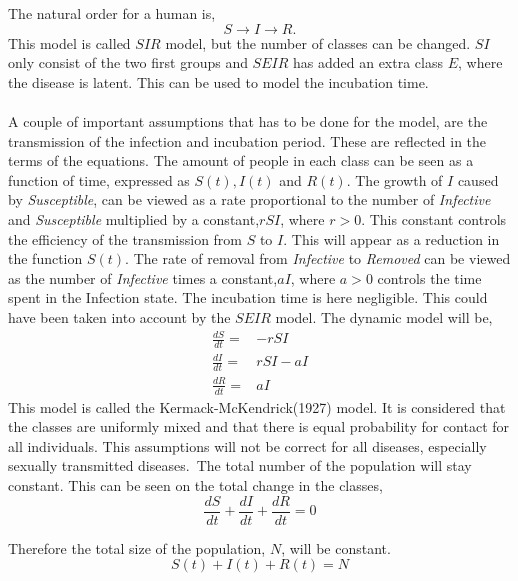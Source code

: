 \documentclass[%
twoside,                 %
final,                   %
10pt]{article}
\begin{document}
\noindent
The natural order for a human is,
\begin{equation}
S \rightarrow I \rightarrow R.
\end{equation}
This model is called $SIR$ model, but the number of classes can be changed. $SI$ only consist of the two first groups and $SEIR$ has added an extra class $E$, where the disease is latent. This can be used to model the incubation time. 
\\
\\
A couple of important assumptions that has to be done for the model, are the transmission of the infection and incubation period. These are reflected in the terms of the equations. The amount of people in each class can be seen as a function of time, expressed as $S(t),I(t)$ and $R(t)$. The growth of $I$ caused by \emph{Susceptible}, can be viewed as a rate proportional to the number of \emph{Infective} and \emph{Susceptible} multiplied by a constant,$rSI$, where $r>0$. This constant controls the efficiency of the transmission from $S$ to $I$. This will appear as a reduction in the function $S(t)$. The rate of removal from \emph{Infective} to \emph{Removed} can be viewed as the number of \emph{Infective} times a constant,$aI$, where $a>0$ controls the time spent in the Infection state. The incubation time is here negligible. This could have been taken into account by the $SEIR$ model. The dynamic model will be,
\begin{align} 
\frac{dS}{dt} =& -rSI \nonumber\\
\frac{dI}{dt} =& rSI-aI \label{eq:SIR_model}\\
\frac{dR}{dt} =& aI \nonumber
\end{align}
This model is called the Kermack-McKendrick(1927) model. It is considered that the classes are uniformly mixed and that there is equal probability for contact for all individuals. This assumptions will not be correct for all diseases, especially sexually transmitted diseases. The total number of the population will stay constant. This can be seen on the total change in the classes,
\begin{equation}
\frac{dS}{dt} + \frac{dI}{dt} + \frac{dR}{dt} = 0
\end{equation}

Therefore the total size of the population, $N$, will be constant. 
\begin{equation} \label{eq:SIR_N}
S(t)+I(t)+R(t) = N
\end{equation}
\end{document}
